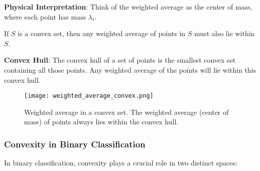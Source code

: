 \textbf{Physical Interpretation}: Think of the weighted average as the center of mass, where each point has mass \(\lambda_i\).

\begin{theorem}
If \(S\) is a convex set, then any weighted average of points in \(S\) must also lie within \(S\).
\end{theorem}

\textbf{Convex Hull}: The convex hull of a set of points is the smallest convex set containing all those points. Any weighted average of the points will lie within this convex hull.

\begin{figure}[H]
    \centering
    \texttt{[image: weighted\_average\_convex.png]}
    \caption{Weighted average in a convex set. The weighted average (center of mass) of points always lies within the convex hull.}
    \label{fig:weighted_average_convex}
\end{figure}

\subsubsection{Convexity in Binary Classification}

In binary classification, convexity plays a crucial role in two distinct spaces:

